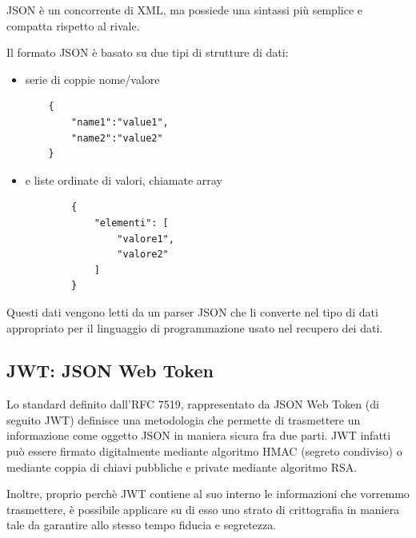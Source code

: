 \documentclass[twoside]{report}
\begin{document}
JSON è un concorrente di XML, ma possiede una sintassi più semplice e compatta rispetto al rivale.

Il formato JSON è basato su due tipi di strutture di dati: 
\begin{itemize}
\item serie di coppie nome/valore
    \begin{listing}[h!]
    \begin{verbatim}
    {
        "name1":"value1", 
        "name2":"value2"
    }
    \end{verbatim}
    \end{listing}
    \FloatBarrier

\item e liste ordinate di valori, chiamate array
    \begin{listing}[h!]
        \begin{verbatim}
        {
            "elementi": [
                "valore1", 
                "valore2"
            ]
        }
        \end{verbatim}
        \end{listing}
        \FloatBarrier
\end{itemize}
Questi dati vengono letti da un parser JSON che li converte nel tipo di dati appropriato per il linguaggio di programmazione usato nel recupero dei dati.

\subsection{JWT: JSON Web Token}
\graphicspath{ {../progetto/images/jwt/} }

Lo standard definito dall'RFC 7519, rappresentato da JSON Web Token (di seguito JWT) definisce una metodologia che permette di trasmettere un informazione come oggetto JSON in maniera sicura fra due parti.
JWT infatti può essere firmato digitalmente mediante algoritmo HMAC (segreto condiviso) o mediante coppia di chiavi pubbliche e private mediante algoritmo RSA.

Inoltre, proprio perchè JWT contiene al suo interno le informazioni che vorremmo trasmettere, è possibile applicare su di esso uno strato di crittografia in maniera tale da garantire allo stesso tempo fiducia e segretezza.
\end{document}
